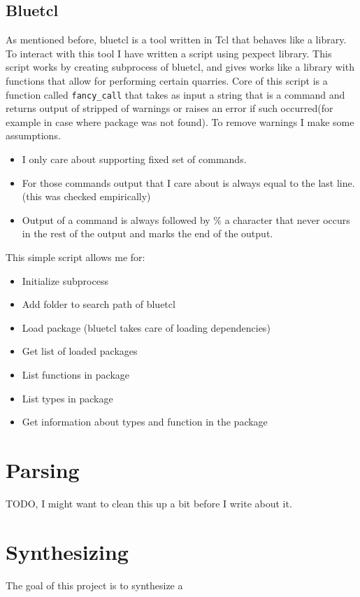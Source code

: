\documentclass[14pt]{report}
\begin{document}
\subsection{Bluetcl}
As mentioned before, bluetcl is a tool written in Tcl that behaves like a library. To interact with this tool I have written a script using pexpect library. This script works by creating subprocess of bluetcl, and gives works like a library with functions that allow for performing certain quarries. Core of this script is a function called \verb!fancy_call! that takes as input a string that is a command and returns output of stripped of warnings or raises an error if such occurred(for example in case where package was not found). To remove warnings I make some assumptions.
\begin{itemize}
    \item I only care about supporting fixed set of commands.
    \item For those commands output that I care about is always equal to the last line. (this was checked empirically)
    \item Output of a command is always followed by $\%$ a character that never occurs in the rest of the output and marks the end of the output.
\end{itemize}

This simple script allows me for:
\begin{itemize}
    \item Initialize subprocess
    \item Add folder to search path of bluetcl
    \item Load package (bluetcl takes care of loading dependencies)
    \item Get list of loaded packages
    \item List functions in package
    \item List types in package
    \item Get information about types and function in the package
\end{itemize}

\section{Parsing}
TODO, I might want to clean this up a bit before I write about it.


\section{Synthesizing}
The goal of this project is to synthesize a 
\end{document}
